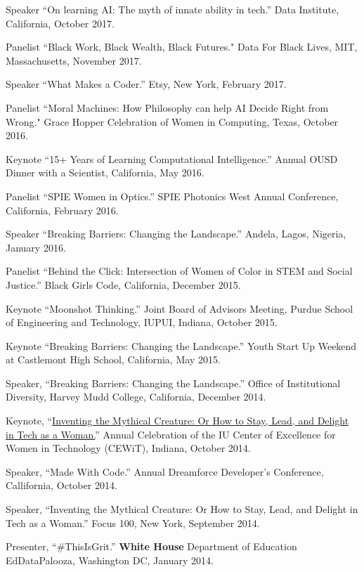 \documentclass[11pt,article,oneside]{memoir}
\begin{document}
\ind Speaker ``On learning AI: The myth of innate ability in tech.'' Data Institute, California, October 2017.

\ind Panelist ``Black Work, Black Wealth, Black Futures." Data For Black Lives, MIT, Massachusetts, November 2017.

\ind Speaker ``What Makes a Coder.'' Etsy, New York, February 2017.

\ind Panelist ``Moral Machines: How Philosophy can help AI Decide Right from Wrong." Grace Hopper Celebration of Women in Computing, Texas, October 2016.

\ind Keynote ``15+ Years of Learning Computational Intelligence.'' Annual OUSD Dinner with a Scientist, California, May 2016.

\ind Panelist ``SPIE Women in Optics.'' SPIE Photonics West Annual Conference, California, February 2016.

\ind Speaker ``Breaking Barriers: Changing the Landscape.'' Andela, Lagos, Nigeria, January 2016.

\ind Panelist ``Behind the Click: Intersection of Women of Color in STEM and Social Justice.'' Black Girls Code, California, December 2015.

\ind Keynote ``Moonshot Thinking.'' Joint Board of Advisors Meeting, Purdue School of Engineering and Technology, IUPUI, Indiana, October 2015.

\ind Keynote ``Breaking Barriers: Changing the Landscape.'' Youth Start Up Weekend at Castlemont High School, California, May 2015.

\ind Speaker, ``Breaking Barriers: Changing the Landscape.'' Office of Institutional Diversity, Harvey Mudd College, California, December 2014.

\ind Keynote, ``\href{https://www.youtube.com/watch?v=owXez6sIRbY&ab_channel=IUCEWIT}{Inventing the Mythical Creature: Or How to Stay, Lead, and Delight in Tech as a Woman.}'' Annual Celebration of the IU Center of Excellence for Women in Technology (CEWiT), Indiana, October 2014.

\ind Speaker, ``Made With Code.'' Annual Dreamforce Developer's Conference, Callifornia, October 2014.

\ind Speaker, ``Inventing the Mythical Creature: Or How to Stay, Lead, and Delight in Tech as a Woman.'' Focus 100, New York, September 2014.

\ind Presenter, ``\#ThisIsGrit.'' \textbf{White House} Department of Education EdDataPalooza, Washington DC, January 2014.
\end{document}
